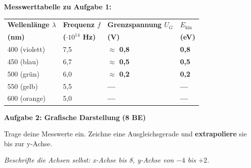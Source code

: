\documentclass[11pt,a4paper]{article}
\newcommand{\lsg}[1]{\textcolor{loesung}{\textbf{#1}}}
\begin{document}
\textbf{Messwerttabelle zu Aufgabe 1:}

\vspace{0.3em}

\begin{center}
\begin{tabular}{|p{3.5cm}|p{3cm}|p{4cm}|p{4cm}|}
\hline
\textbf{Wellenlänge $\lambda$} & \textbf{Frequenz $f$} & \textbf{Grenzspannung $U_G$} & \textbf{$E_{\text{kin}}$} \\
\textbf{(nm)} & \textbf{($\cdot 10^{14}$ Hz)} & \textbf{(V)} & \textbf{(eV)} \\
\hline
400 (violett) & 7,5 & \lsg{$\approx$ 0,8} & \lsg{0,8} \\[1.2em]
\hline
450 (blau) & 6,7 & \lsg{$\approx$ 0,5} & \lsg{0,5} \\[1.2em]
\hline
500 (grün) & 6,0 & \lsg{$\approx$ 0,2} & \lsg{0,2} \\[1.2em]
\hline
550 (gelb) & 5,5 & \lsg{---} & \lsg{---} \\[1.2em]
\hline
600 (orange) & 5,0 & \lsg{---} & \lsg{---} \\[1.2em]
\hline
\end{tabular}
\end{center}

\vspace{0.5em}


\textbf{Aufgabe 2: Grafische Darstellung} \hfill \textbf{(8 BE)}

Trage deine Messwerte ein. Zeichne eine Ausgleichsgerade und \textbf{extrapoliere} sie bis zur y-Achse.

\textit{Beschrifte die Achsen selbst: x-Achse bis 8, y-Achse von $-4$ bis $+2$.}

\vspace{0.3em}
\end{document}

